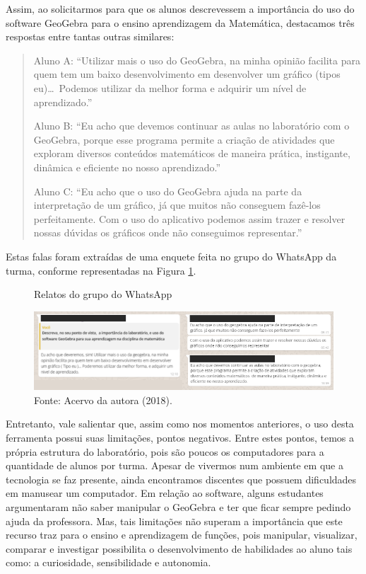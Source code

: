 \begin{refsection}
    Assim, ao solicitarmos para que os alunos descrevessem a importância do uso do software GeoGebra para o ensino aprendizagem da Matemática, destacamos três respostas entre tantas outras similares:
    \begin{quotation}
        \medskip\noindent{}Aluno A: “Utilizar mais o uso do GeoGebra, na minha opinião facilita para quem tem um baixo desenvolvimento em desenvolver um gráfico (tipos eu)\dots~Podemos utilizar da melhor forma e adquirir um nível de aprendizado.”

        \medskip\noindent{}Aluno B: “Eu acho que devemos continuar as aulas no laboratório com o GeoGebra, porque esse programa permite a criação de atividades que exploram diversos conteúdos matemáticos de maneira prática, instigante, dinâmica e eficiente no nosso aprendizado.” 
        
        \medskip\noindent{}Aluno C: “Eu acho que o uso do GeoGebra ajuda na parte da interpretação de um gráfico, já que muitos não conseguem fazê-los perfeitamente. Com o uso do aplicativo podemos assim trazer e resolver nossas dúvidas os gráficos onde não conseguimos representar.” 
    \end{quotation}
    Estas falas foram extraídas de uma enquete feita no grupo do WhatsApp da turma, conforme representadas na Figura \ref{fig:relatos-wpp}.

    \begin{figure}[ht]%
        \centering%
        \caption{Relatos do grupo do WhatsApp}%
        \includegraphics[width=.90\textwidth]{articles/03-contribuicoes-do-sof/image15.png}%
        \caption*{Fonte: Acervo da autora (2018).}%
        \label{fig:relatos-wpp}%
    \end{figure}%

    Entretanto, vale salientar que, assim como nos momentos anteriores, o uso desta ferramenta possui suas limitações, pontos negativos. Entre estes pontos, temos a própria estrutura do laboratório, pois são poucos os computadores para a quantidade de alunos por turma. Apesar de vivermos num ambiente em que a tecnologia se faz presente, ainda encontramos discentes que possuem dificuldades em manusear um computador. Em relação ao software, alguns estudantes argumentaram não saber manipular o GeoGebra e ter que ficar sempre pedindo ajuda da professora. Mas, tais limitações não superam a importância que este recurso traz para o ensino e aprendizagem de funções, pois manipular, visualizar, comparar e investigar possibilita o desenvolvimento de habilidades ao aluno tais como: a curiosidade, sensibilidade e autonomia.


\end{refsection}
